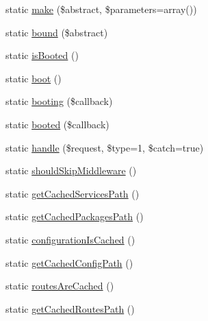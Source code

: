 \begin{DoxyCompactItemize}
\item 
static \mbox{\hyperlink{class_illuminate_1_1_support_1_1_facades_1_1_app_a9087a869e39848f508cbdfa818b4a454}{make}} (\$abstract, \$parameters=array())
\item 
static \mbox{\hyperlink{class_illuminate_1_1_support_1_1_facades_1_1_app_aa6d5af98bdd9a231d94c84e2a043ee5a}{bound}} (\$abstract)
\item 
static \mbox{\hyperlink{class_illuminate_1_1_support_1_1_facades_1_1_app_a91c8977631218fb1ac7567a28f5e0fd5}{is\+Booted}} ()
\item 
static \mbox{\hyperlink{class_illuminate_1_1_support_1_1_facades_1_1_app_a16111fedc54691f0dedb21575c3bad06}{boot}} ()
\item 
static \mbox{\hyperlink{class_illuminate_1_1_support_1_1_facades_1_1_app_a6e0a1ea8829091159951d60b5b5b11f3}{booting}} (\$callback)
\item 
static \mbox{\hyperlink{class_illuminate_1_1_support_1_1_facades_1_1_app_a066383a4a716aa8a23376781d90a0c87}{booted}} (\$callback)
\item 
static \mbox{\hyperlink{class_illuminate_1_1_support_1_1_facades_1_1_app_a291c55e10567a9c70b8df904fbfc0dcf}{handle}} (\$request, \$type=1, \$catch=true)
\item 
static \mbox{\hyperlink{class_illuminate_1_1_support_1_1_facades_1_1_app_a10f125eb3c7536818ed2cfe0458e179b}{should\+Skip\+Middleware}} ()
\item 
static \mbox{\hyperlink{class_illuminate_1_1_support_1_1_facades_1_1_app_a3bee1241aff9a729fe35c6e33046874d}{get\+Cached\+Services\+Path}} ()
\item 
static \mbox{\hyperlink{class_illuminate_1_1_support_1_1_facades_1_1_app_ab0155c3a224efa33a4683fdaf7d5d6ea}{get\+Cached\+Packages\+Path}} ()
\item 
static \mbox{\hyperlink{class_illuminate_1_1_support_1_1_facades_1_1_app_adb1cfc609d273f015bb69a56a958252f}{configuration\+Is\+Cached}} ()
\item 
static \mbox{\hyperlink{class_illuminate_1_1_support_1_1_facades_1_1_app_a231ce9e7ff90f62295b0ddc8b6cdd2a1}{get\+Cached\+Config\+Path}} ()
\item 
static \mbox{\hyperlink{class_illuminate_1_1_support_1_1_facades_1_1_app_a9ba11e68d2803f0c1d9f6fa33bf2f4e0}{routes\+Are\+Cached}} ()
\item 
static \mbox{\hyperlink{class_illuminate_1_1_support_1_1_facades_1_1_app_ae516b37acb35a241b58c5ae908fe446e}{get\+Cached\+Routes\+Path}} ()
\item 

\end{DoxyCompactItemize}

